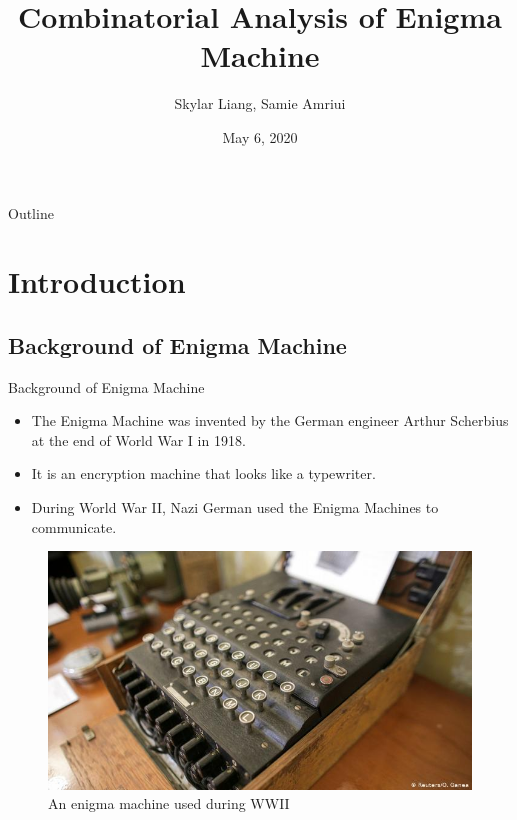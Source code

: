 \documentclass{beamer}
\title[Your Short Title]{Combinatorial Analysis of Enigma Machine}
\author{Skylar Liang, Samie Amriui}
\date{May 6, 2020}
\begin{document}
\begin{frame}
  \titlepage
\end{frame}

\begin{frame}{Outline}
  \tableofcontents
\end{frame}

\section{Introduction}
\subsection{Background of Enigma Machine}
\begin{frame}{Background of Enigma Machine}

\begin{itemize}
   \item The Enigma Machine was invented by the German engineer Arthur Scherbius at the end of World War I in 1918.
   \item It is an encryption machine that looks like a typewriter.
   \item During World War II, Nazi German used the Enigma Machines to communicate.
\end{itemize}
\vskip 1cm
\begin{figure}
\includegraphics[scale=0.3]{Enigma_Machine.jpg}
\caption{An enigma machine used during WWII}
\end{figure}
\end{frame}
\end{document}
